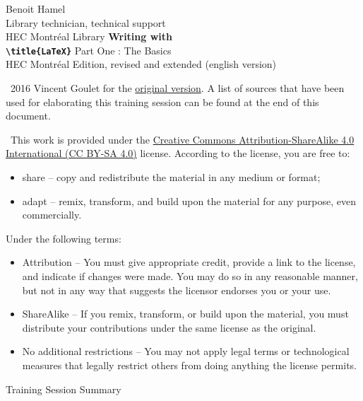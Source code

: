 \scriptsize

\begin{frame}
	Benoit Hamel \\
	Library technician, technical support \\
	HEC Montréal Library
	\vfill
	{
		\Huge\bfseries
		Writing with \\
		\texttt{\textbackslash title\{\textrm{\LaTeX}\}}
	}
	\vfill
	Part One : The Basics \\
	HEC Montréal Edition, revised and extended (english version)
\end{frame}

\begin{frame}
	\faCopyright\ 2016 Vincent Goulet for the 
	\href{https://ctan.org/pkg/formation-latex-ul}{original version}. A list of sources that have been used
	for elaborating this training session can be found at the end of this document.
	
	\faCreativeCommons\ This work is provided under the  
	\href{http://creativecommons.org/licenses/by-sa/4.0/deed.en}{%
	Creative Commons Attribution-ShareAlike 4.0 International (CC BY-SA 4.0)} license. 
	According to the license, you are free to:
	
	\begin{itemize}
		\item share -- copy and redistribute the material in any medium or format;
		\item adapt -- remix, transform, and build upon the material
		for any purpose, even commercially.
	\end{itemize}

	Under the following terms:
	
	\begin{itemize}
		\item Attribution -- You must give appropriate credit, provide a link to the license, and indicate if changes were made. You may do so in any reasonable manner, but not in any way that suggests the licensor endorses you or your use.
		\item ShareAlike -- If you remix, transform, or build upon the material, you must distribute your contributions under the same license as the original.
		\item No additional restrictions -- You may not apply legal terms or technological measures that legally restrict others from doing anything the license permits.
	\end{itemize}
\end{frame}

\begin{frame}{Training Session Summary}
	\begin{columns}[onlytextwidth]
		\begin{column}{.49\textwidth}
			\tableofcontents[sections={1-3}]
		\end{column}
		\begin{column}{.49\textwidth}
			\tableofcontents[sections={4-6}]
		\end{column}
	\end{columns}
\end{frame}